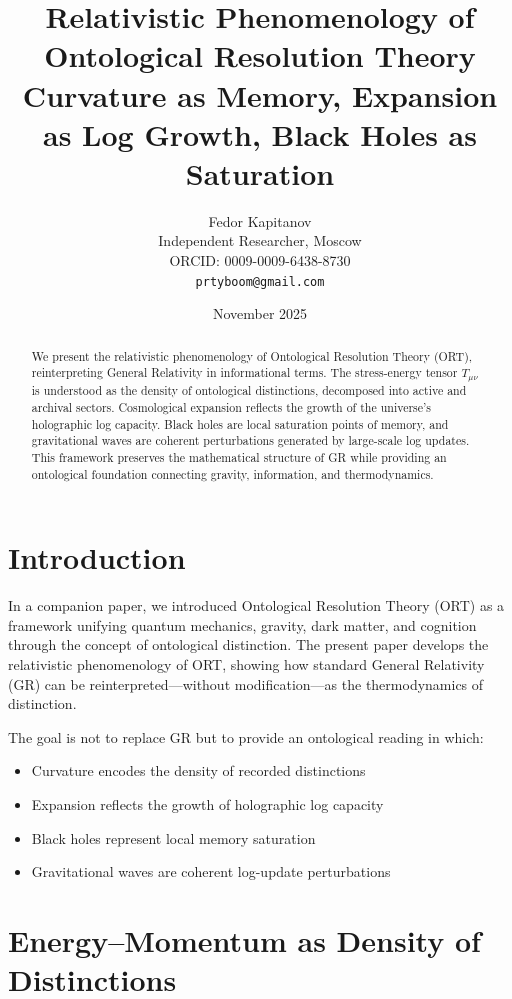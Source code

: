 \documentclass[12pt,a4paper]{article}
\title{\textbf{Relativistic Phenomenology of Ontological Resolution Theory}\\[0.3em]
\large Curvature as Memory, Expansion as Log Growth, Black Holes as Saturation}
\author{
Fedor Kapitanov\\[0.3em]
\small Independent Researcher, Moscow\\
\small ORCID: 0009-0009-6438-8730\\
\small \texttt{prtyboom@gmail.com}
}
\date{November 2025}
\begin{document}
\maketitle

\begin{abstract}
We present the relativistic phenomenology of Ontological Resolution Theory (ORT), reinterpreting General Relativity in informational terms. The stress-energy tensor $T_{\mu\nu}$ is understood as the density of ontological distinctions, decomposed into active and archival sectors. Cosmological expansion reflects the growth of the universe's holographic log capacity. Black holes are local saturation points of memory, and gravitational waves are coherent perturbations generated by large-scale log updates. This framework preserves the mathematical structure of GR while providing an ontological foundation connecting gravity, information, and thermodynamics.
\end{abstract}

\tableofcontents
\newpage

\section{Introduction}

In a companion paper, we introduced Ontological Resolution Theory (ORT) as a framework unifying quantum mechanics, gravity, dark matter, and cognition through the concept of ontological distinction. The present paper develops the relativistic phenomenology of ORT, showing how standard General Relativity (GR) can be reinterpreted---without modification---as the thermodynamics of distinction.

The goal is not to replace GR but to provide an ontological reading in which:
\begin{itemize}
    \item Curvature encodes the density of recorded distinctions
    \item Expansion reflects the growth of holographic log capacity
    \item Black holes represent local memory saturation
    \item Gravitational waves are coherent log-update perturbations
\end{itemize}

\section{Energy--Momentum as Density of Distinctions}
\end{document}
